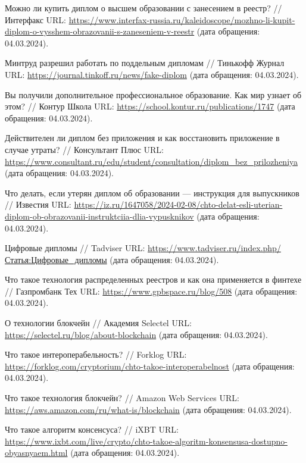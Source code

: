 \begin{thebibliography}{99\kern\bibindent}
	 Можно ли купить диплом о высшем образовании с занесением в реестр? // Интерфакс URL: \url{https://www.interfax-russia.ru/kaleidoscope/mozhno-li-kupit-diplom-o-vysshem-obrazovanii-s-zaneseniem-v-reestr} (дата обращения: 04.03.2024).

	 Минтруд разрешил работать по поддельным дипломам // Тинькофф Журнал URL: \url{https://journal.tinkoff.ru/news/fake-diplom} (дата обращения: 04.03.2024).

	 Вы получили дополнительное профессиональное образование. Как мир узнает об этом? // Контур Школа URL: \url{https://school.kontur.ru/publications/1747} (дата обращения: 04.03.2024).

	 Действителен ли диплом без приложения и как восстановить приложение в случае утраты? // Консультант Плюс URL: \url{https://www.consultant.ru/edu/student/consultation/diplom_bez_prilozheniya} (дата обращения: 04.03.2024).

	 Что делать, если утерян диплом об образовании — инструкция для выпускников // Известия URL: \url{https://iz.ru/1647058/2024-02-08/chto-delat-esli-uterian-diplom-ob-obrazovanii-instruktciia-dlia-vypusknikov} (дата обращения: 04.03.2024).

	 Цифровые дипломы // Tadviser URL: \url{https://www.tadviser.ru/index.php/Статья:Цифровые_дипломы} (дата обращения: 04.03.2024).

	 Что такое технология распределенных реестров и как она применяется в финтехе // Газпромбанк Тех URL: \url{https://www.gpbspace.ru/blog/508} (дата обращения: 04.03.2024).

	 О технологии блокчейн // Академия Selectel URL: \url{https://selectel.ru/blog/about-blockchain} (дата обращения: 04.03.2024).

	 Что такое интероперабельность? // Forklog URL: \url{https://forklog.com/cryptorium/chto-takoe-interoperabelnost} (дата обращения: 04.03.2024).

	 Что такое технология блокчейн? // Amazon Web Services URL: \url{https://aws.amazon.com/ru/what-is/blockchain} (дата обращения: 04.03.2024).

	 Что такое алгоритм консенсуса? // iXBT URL: \url{https://www.ixbt.com/live/crypto/chto-takoe-algoritm-konsensusa-dostupno-obyasnyaem.html} (дата обращения: 04.03.2024).


\end{thebibliography}

